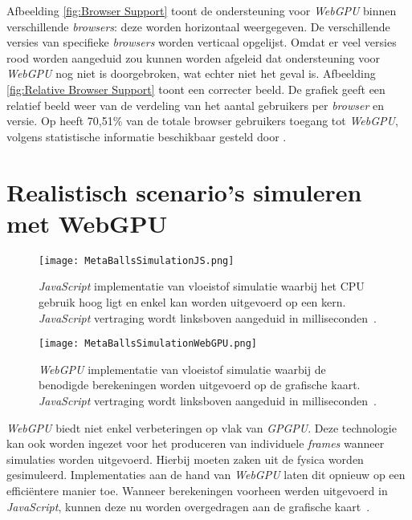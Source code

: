 \bigbreak{}
\date{}

Afbeelding \ref{fig:Browser Support} toont de ondersteuning voor \textit{WebGPU} binnen verschillende \textit{browsers}: deze worden horizontaal weergegeven. De verschillende versies van specifieke \textit{browsers} worden verticaal opgelijst. Omdat er veel versies rood worden aangeduid zou kunnen worden afgeleid dat ondersteuning voor \textit{WebGPU} nog niet is doorgebroken, wat echter niet het geval is. Afbeelding \ref{fig:Relative Browser Support} toont een correcter beeld. De grafiek geeft een relatief beeld weer van de verdeling van het aantal gebruikers per \textit{browser} en versie. Op   heeft 70,51\% van de totale browser gebruikers toegang tot \textit{WebGPU}, volgens statistische informatie beschikbaar gesteld door \textcite{Deveria2024}.

\section{Realistisch scenario's simuleren met WebGPU}

\begin{figure}
    \texttt{[image: MetaBallsSimulationJS.png]}
    \caption[\textit{JavaScript} implementatie van vloeistof simulatie~\autocite{Jones2024}]{
        \textit{JavaScript} implementatie van vloeistof simulatie waarbij het CPU gebruik hoog ligt en enkel kan worden uitgevoerd op een kern. \textit{JavaScript} vertraging wordt linksboven aangeduid in milliseconden~\autocite{Jones2024}.
    }
    \label{fig:MetaBallsSimulationJS}
\end{figure}

\begin{figure}
    \texttt{[image: MetaBallsSimulationWebGPU.png]}
    \caption[\textit{WebGPU} implementatie van vloeistof simulatie~\autocite{Jones2024}]{
        \textit{WebGPU} implementatie van vloeistof simulatie waarbij de benodigde berekeningen worden uitgevoerd op de grafische kaart. \textit{JavaScript} vertraging wordt linksboven aangeduid in milliseconden~\autocite{Jones2024}.
    }
    \label{fig:MetaBallsSimulationWebGPU}
\end{figure}

\textit{WebGPU} biedt niet enkel verbeteringen op vlak van \textit{GPGPU}. Deze technologie kan ook worden ingezet voor het produceren van individuele \textit{frames} wanneer simulaties worden uitgevoerd. Hierbij moeten zaken uit de fysica worden gesimuleerd. Implementaties aan de hand van \textit{WebGPU} laten dit opnieuw op een efficiëntere manier toe. Wanneer berekeningen voorheen werden uitgevoerd in \textit{JavaScript}, kunnen deze nu worden overgedragen aan de grafische kaart~\autocite{Wallez2023}.

